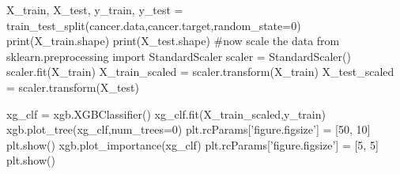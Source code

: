 \documentclass[%
oneside,                 %
final,                   %
10pt]{article}
\begin{document}
X_train, X_test, y_train, y_test = train_test_split(cancer.data,cancer.target,random_state=0)
print(X_train.shape)
print(X_test.shape)
#now scale the data
from sklearn.preprocessing import StandardScaler
scaler = StandardScaler()
scaler.fit(X_train)
X_train_scaled = scaler.transform(X_train)
X_test_scaled = scaler.transform(X_test)

xg_clf = xgb.XGBClassifier()
xg_clf.fit(X_train_scaled,y_train)
xgb.plot_tree(xg_clf,num_trees=0)
plt.rcParams['figure.figsize'] = [50, 10]
plt.show()
xgb.plot_importance(xg_clf)
plt.rcParams['figure.figsize'] = [5, 5]
plt.show()
\epycod


\end{document}
